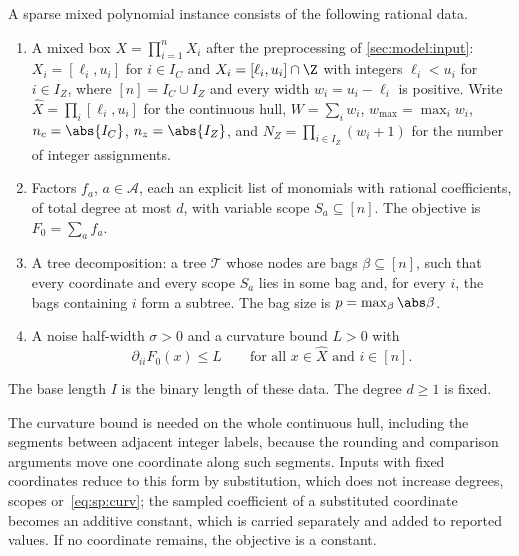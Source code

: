 \begin{definition}\label{def:sp:instance}
A sparse mixed polynomial instance consists of the following rational data.
\begin{enumerate}[label=(\roman*)]
\item A mixed box $X=\prod_{i=1}^nX_i$ after the preprocessing of
\cref{sec:model:input}: $X_i=[\ell_i,u_i]$ for $i\in I_C$ and
$X_i=[\ell_i,u_i]\cap\Z$ with integers $\ell_i<u_i$ for $i\in I_Z$, where
$[n]=I_C\cup I_Z$ and every width $w_i=u_i-\ell_i$ is positive. Write
$\widehat X=\prod_i[\ell_i,u_i]$ for the continuous hull,
$W=\sum_iw_i$, $w_{\max}=\max_iw_i$, $n_c=\abs{I_C}$, $n_z=\abs{I_Z}$, and
$N_Z=\prod_{i\in I_Z}(w_i+1)$ for the number of integer assignments.
\item Factors $f_a$, $a\in\mathcal A$, each an explicit list of monomials
with rational coefficients, of total degree at most $d$, with variable scope
$S_a\subseteq[n]$. The objective is $F_0=\sum_af_a$.
\item A tree decomposition: a tree $\mathcal T$ whose nodes are bags
$\beta\subseteq[n]$, such that every coordinate and every scope $S_a$ lies
in some bag and, for every $i$, the bags containing $i$ form a subtree.
The bag size is $p=\max_\beta\abs\beta$.
\item A noise half-width $\sigma>0$ and a curvature bound $L>0$ with
\begin{equation}\label{eq:sp:curv}
 \partial_{ii}F_0(x)\le L\qquad\text{for all }x\in\widehat X\text{ and }i\in[n].
\end{equation}
\end{enumerate}
The base length $I$ is the binary length of these data. The degree $d\ge1$
is fixed.
\end{definition}

The curvature bound is needed on the whole continuous hull, including the
segments between adjacent integer labels, because the rounding and
comparison arguments move one coordinate along such segments. Inputs with
fixed coordinates reduce to this form by substitution, which does not
increase degrees, scopes or~\eqref{eq:sp:curv}; the sampled coefficient of a
substituted coordinate becomes an additive constant, which is carried
separately and added to reported values. If no coordinate remains, the
objective is a constant.


